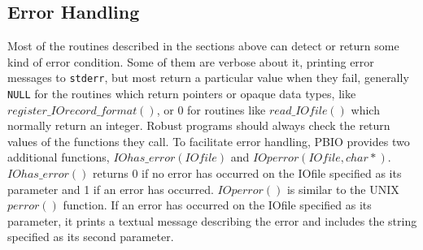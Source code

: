 \documentclass{article}
\begin{document}
\subsection{Error Handling}
Most of the routines described in the sections above can detect or return some
kind of error condition.  Some of them are verbose about it, printing error
messages to {\tt stderr}, but most return a particular value when they fail,
generally {\tt NULL} for the routines which return pointers or opaque data
types, like $register\_IOrecord\_format()$, or $0$ for routines like
$read\_IOfile()$ which normally return an integer.  Robust programs should
always check the return values of the functions they call.  To facilitate
error handling, PBIO provides two additional functions, $IOhas\_error(IOfile)$
and $IOperror(IOfile, char*)$.  $IOhas\_error()$ returns 0 if no error has
occurred on the IOfile specified as its parameter and 1 if an error has
occurred.  $IOperror()$ is similar to the UNIX $perror()$ function.  If an
error has occurred on the IOfile specified as its parameter, it prints a
textual message describing the error and includes the string specified as its
second parameter.
%
\end{document}
